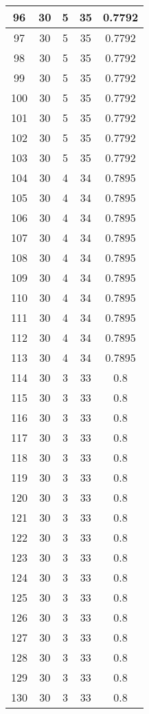 \documentclass[letterpaper, 12pt]{article}
\begin{document}
\begin{longtable}{|c|c|c|c|c|}
\hline
96 & 30 & 5 & 35 & 0.7792 \\
\hline
97 & 30 & 5 & 35 & 0.7792 \\
\hline
98 & 30 & 5 & 35 & 0.7792 \\
\hline
99 & 30 & 5 & 35 & 0.7792 \\
\hline
100 & 30 & 5 & 35 & 0.7792 \\
\hline
101 & 30 & 5 & 35 & 0.7792 \\
\hline
102 & 30 & 5 & 35 & 0.7792 \\
\hline
103 & 30 & 5 & 35 & 0.7792 \\
\hline
104 & 30 & 4 & 34 & 0.7895 \\
\hline
105 & 30 & 4 & 34 & 0.7895 \\
\hline
106 & 30 & 4 & 34 & 0.7895 \\
\hline
107 & 30 & 4 & 34 & 0.7895 \\
\hline
108 & 30 & 4 & 34 & 0.7895 \\
\hline
109 & 30 & 4 & 34 & 0.7895 \\
\hline
110 & 30 & 4 & 34 & 0.7895 \\
\hline
111 & 30 & 4 & 34 & 0.7895 \\
\hline
112 & 30 & 4 & 34 & 0.7895 \\
\hline
113 & 30 & 4 & 34 & 0.7895 \\
\hline
114 & 30 & 3 & 33 & 0.8 \\
\hline
115 & 30 & 3 & 33 & 0.8 \\
\hline
116 & 30 & 3 & 33 & 0.8 \\
\hline
117 & 30 & 3 & 33 & 0.8 \\
\hline
118 & 30 & 3 & 33 & 0.8 \\
\hline
119 & 30 & 3 & 33 & 0.8 \\
\hline
120 & 30 & 3 & 33 & 0.8 \\
\hline
121 & 30 & 3 & 33 & 0.8 \\
\hline
122 & 30 & 3 & 33 & 0.8 \\
\hline
123 & 30 & 3 & 33 & 0.8 \\
\hline
124 & 30 & 3 & 33 & 0.8 \\
\hline
125 & 30 & 3 & 33 & 0.8 \\
\hline
126 & 30 & 3 & 33 & 0.8 \\
\hline
127 & 30 & 3 & 33 & 0.8 \\
\hline
128 & 30 & 3 & 33 & 0.8 \\
\hline
129 & 30 & 3 & 33 & 0.8 \\
\hline
130 & 30 & 3 & 33 & 0.8 \\

\end{longtable}
\end{document}
